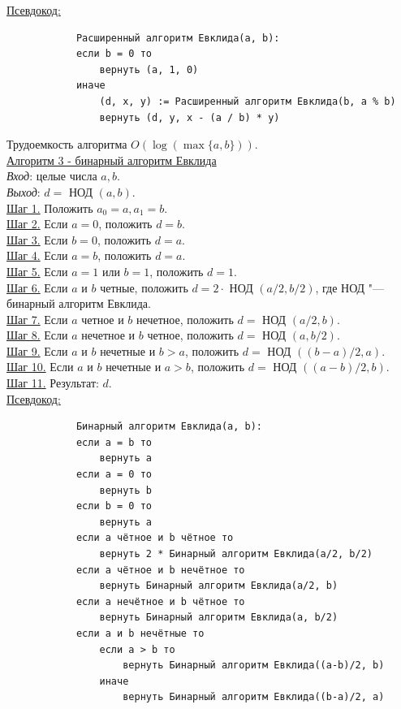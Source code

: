 \documentclass[bachelor, och, labwork]{shiza}
\begin{document}
        \underline{Псевдокод:}
            \begin{verbatim}
            Расширенный алгоритм Евклида(a, b):
            если b = 0 то
                вернуть (a, 1, 0)
            иначе
                (d, x, y) := Расширенный алгоритм Евклида(b, a % b)
                вернуть (d, y, x - (a / b) * y)                
            \end{verbatim}

            Трудоемкость алгоритма $O(\log(\max\{a, b\}))$.\\


        \underline{Алгоритм 3 - бинарный алгоритм Евклида}\\
            \textit{Вход}: целые числа $a, b$.\\
            \textit{Выход}: $d =$ НОД $(a, b)$.\\
            \underline{Шаг 1.} Положить $a_0 = a, a_1 = b$.\\ 
            \underline{Шаг 2.} Если $a = 0$, положить $d = b$.\\
            \underline{Шаг 3.} Если $b = 0$, положить $d = a$.\\
            \underline{Шаг 4.} Если $a = b$, положить $d = a$.\\
            \underline{Шаг 5.} Если $a = 1$ или $b = 1$, положить $d = 1$.\\
            \underline{Шаг 6.} Если $a$ и $b$ четные, положить $d = 2 \cdot$ НОД
            $(a / 2, b / 2)$, где НОД "--- бинарный алгоритм Евклида.\\
            \underline{Шаг 7.} Если $a$ четное и $b$ нечетное, положить $d =$
            НОД $(a / 2, b)$.\\
            \underline{Шаг 8.} Если $a$ нечетное и $b$ четное, положить $d =$
            НОД $(a, b / 2)$.\\
            \underline{Шаг 9.} Если $a$ и $b$ нечетные и $b > a$, положить $d =$
            НОД $((b - a) / 2, a)$.\\
            \underline{Шаг 10.} Если $a$ и $b$ нечетные и $a > b$, положить $d =$
            НОД $((a - b) / 2, b)$.\\
            \underline{Шаг 11.} Результат: $d$.\\

        \underline{Псевдокод:}
            \begin{verbatim}
            Бинарный алгоритм Евклида(a, b):
            если a = b то
                вернуть a
            если a = 0 то
                вернуть b
            если b = 0 то
                вернуть a
            если a чётное и b чётное то
                вернуть 2 * Бинарный алгоритм Евклида(a/2, b/2)
            если a чётное и b нечётное то
                вернуть Бинарный алгоритм Евклида(a/2, b)
            если a нечётное и b чётное то
                вернуть Бинарный алгоритм Евклида(a, b/2)
            если a и b нечётные то
                если a > b то
                    вернуть Бинарный алгоритм Евклида((a-b)/2, b)
                иначе
                    вернуть Бинарный алгоритм Евклида((b-a)/2, a)                      
            \end{verbatim}
\end{document}

